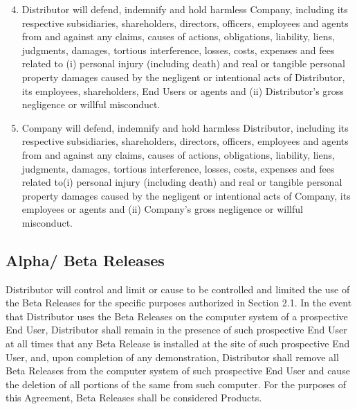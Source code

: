 \documentclass[letterpaper,10pt,english]{sphinxmanual}
\begin{document}
\begin{enumerate}
\setcounter{enumi}{3}
\item {} 
Distributor will defend, indemnify and hold harmless Company, including its respective subsidiaries, shareholders, directors, officers, employees and agents from and against any claims, causes of actions, obligations, liability, liens, judgments, damages, tortious interference, losses, costs, expenses and fees related to (i) personal injury (including death) and real or tangible personal property damages caused by the negligent or intentional acts of Distributor, its employees, shareholders, End Users or agents and (ii) Distributor’s gross negligence or willful misconduct.

\item {} 
Company will defend, indemnify and hold harmless Distributor, including its respective subsidiaries, shareholders, directors, officers, employees and agents from and against any claims, causes of actions, obligations, liability, liens, judgments, damages, tortious interference, losses, costs, expenses and fees related to(i) personal injury (including death) and real or tangible personal property damages caused by the negligent or intentional acts of Company, its employees or agents and (ii) Company’s gross negligence or willful misconduct.

\end{enumerate}


\subsection{Alpha/ Beta Releases}
\label{\detokenize{distributionandpackaging:alpha-beta-releases}}
Distributor will control and limit or cause to be controlled and limited the use of the Beta Releases for the specific purposes authorized in Section 2.1. In the event that Distributor uses the Beta Releases on the computer system of a prospective End User, Distributor shall remain in the presence of such prospective End User at all times that any Beta Release is installed at the site of such prospective End User, and, upon completion of any demonstration, Distributor shall remove all Beta Releases from the computer system of such prospective End User and cause the deletion of all portions of the same from such computer. For the purposes of this Agreement, Beta Releases shall be considered Products.
\end{document}
